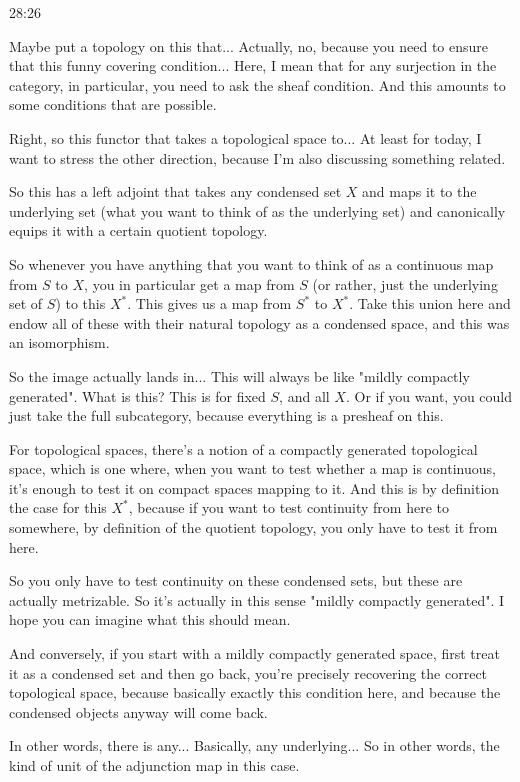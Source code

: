 \begin{example}
\begin{unfinished}{28:26}
\begin{remark}
\begin{remark}
Maybe put a topology on this that... Actually, no, because you need to ensure that this funny covering condition... Here, I mean that for any surjection in the category, in particular, you need to ask the sheaf condition. And this amounts to some conditions that are possible.

\end{remark}

Right, so this functor that takes a topological space to... At least for today, I want to stress the other direction, because I'm also discussing something related.

So this has a left adjoint that takes any condensed set $X$ and maps it to the underlying set (what you want to think of as the underlying set) and canonically equips it with a certain quotient topology.

So whenever you have anything that you want to think of as a continuous map from $S$ to $X$, you in particular get a map from $S$ (or rather, just the underlying set of $S$) to this $X^*$. This gives us a map from $S^*$ to $X^*$. Take this union here and endow all of these with their natural topology as a condensed space, and this was an isomorphism.

So the image actually lands in... This will always be like "mildly compactly generated". What is this? This is for fixed $S$, and all $X$. Or if you want, you could just take the full subcategory, because everything is a presheaf on this.

For topological spaces, there's a notion of a compactly generated topological space, which is one where, when you want to test whether a map is continuous, it's enough to test it on compact spaces mapping to it. And this is by definition the case for this $X^*$, because if you want to test continuity from here to somewhere, by definition of the quotient topology, you only have to test it from here.

So you only have to test continuity on these condensed sets, but these are actually metrizable. So it's actually in this sense "mildly compactly generated". I hope you can imagine what this should mean.

And conversely, if you start with a mildly compactly generated space, first treat it as a condensed set and then go back, you're precisely recovering the correct topological space, because basically exactly this condition here, and because the condensed objects anyway will come back.

In other words, there is any... Basically, any underlying... So in other words, the kind of unit of the adjunction map in this case.


\end{remark}
\end{unfinished}
\end{example}
